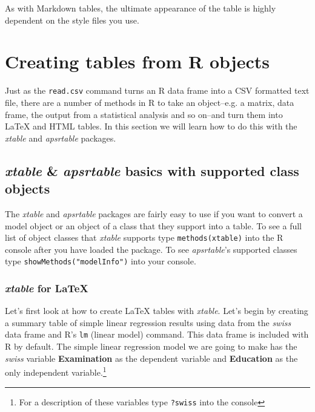\noindent As with Markdown tables, the ultimate appearance of the table is highly dependent on the style files you use.

\section{Creating tables from R objects}

Just as the \texttt{read.csv} command turns an R data frame into a CSV formatted text file, there are a number of methods in R to take an object--e.g. a matrix, data frame, the output from a statistical analysis and so on--and turn them into LaTeX and HTML tables. In this section we will learn how to do this with the \emph{xtable} and \emph{apsrtable} packages.

\subsection{\emph{xtable} \& \emph{apsrtable} basics with supported class objects} 

The \emph{xtable} and \emph{apsrtable} packages are fairly easy to use if you want to convert a model object or an object of a class that they support into a table. To see a full list of object classes that \emph{xtable} supports type \texttt{methods(xtable)} into the R console after you have loaded the package. To see \emph{apsrtable}'s supported classes type \verb|showMethods("modelInfo")| into your console.

\subsubsection{\emph{xtable} for LaTeX}

Let's first look at how to create LaTeX tables with \emph{xtable}. Let's begin by creating a summary table of simple linear regression results using data from the \emph{swiss} data frame and R's \texttt{lm} (linear model) command. This data frame is included with R by default. The simple linear regression model we are going to make has the \emph{swiss} variable \textbf{Examination} as the dependent variable and \textbf{Education} as the only independent variable.\footnote{For a description of these variables type \texttt{?swiss} into the console}

















